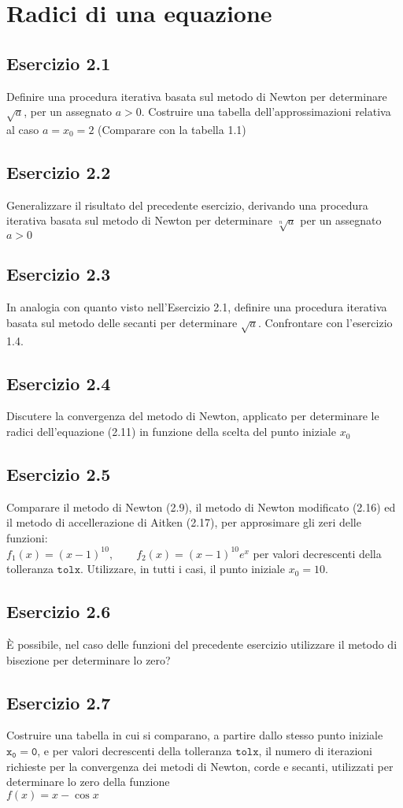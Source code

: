 \chapter{Radici di una equazione}
\label{chap:Radici di una equazione}
\section{Esercizio 2.1}
Definire una procedura iterativa basata sul metodo di Newton per determinare $\sqrt{a}$, per un assegnato $a>0$. Costruire una tabella dell'approssimazioni relativa al caso $a=x_{0}=2$ (Comparare con la tabella 1.1)
\section{Esercizio 2.2}
Generalizzare il risultato del precedente esercizio, derivando una procedura iterativa basata sul metodo di Newton per determinare $\sqrt[n]{a}$ per un assegnato $a>0$
\section{Esercizio 2.3}
In analogia con quanto visto nell'Esercizio 2.1, definire una procedura iterativa basata sul metodo delle secanti per determinare $\sqrt{a}$. Confrontare con l'esercizio 1.4.
\section{Esercizio 2.4}
Discutere la convergenza del metodo di Newton, applicato per determinare le radici dell'equazione (2.11) in funzione della scelta del punto iniziale $x_{0}$
\section{Esercizio 2.5}
Comparare il metodo di Newton (2.9), il metodo di Newton modificato (2.16) ed il metodo di accellerazione di Aitken (2.17), per approsimare gli zeri delle funzioni:\\
\center $f_{1}(x) = (x-1)^{10}, \qquad f_{2}(x)=(x-1)^{10}e^{x} $
\flushleft per valori decrescenti della tolleranza $\mathtt{tolx}$. Utilizzare, in tutti i casi, il punto iniziale $x_{0}=10$.
\section{Esercizio 2.6}
È possibile, nel caso delle funzioni del precedente esercizio utilizzare il metodo di bisezione per determinare lo zero?
\section{Esercizio 2.7}
Costruire una tabella in cui si comparano, a partire dallo stesso punto iniziale $\mathtt{x_{0} = 0}$, e per valori decrescenti della tolleranza $\mathtt{tolx}$, il numero di iterazioni richieste per la convergenza dei metodi di Newton, corde e secanti, utilizzati per determinare lo zero della funzione\\
\center $f(x) = x - \cos{x}$
\flushleft
